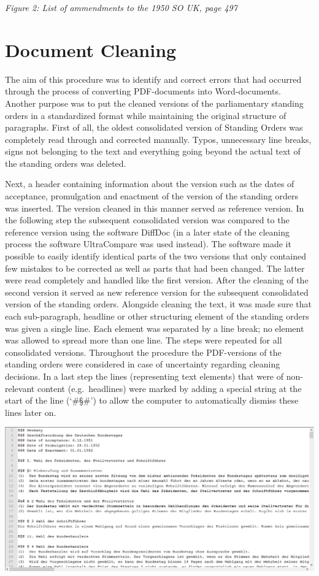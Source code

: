 \documentclass[10pt,]{article}
\begin{document}
\emph{Figure 2: List of ammendments to the 1950 SO UK, page 497}

\newpage

\section{Document Cleaning}\label{document-cleaning}

The aim of this procedure was to identify and correct errors that had
occurred through the process of converting PDF-documents into
Word-documents. Another purpose was to put the cleaned versions of the
parliamentary standing orders in a standardized format while maintaining
the original structure of paragraphs. First of all, the oldest
consolidated version of Standing Orders was completely read through and
corrected manually. Typos, unnecessary line breaks, signs not belonging
to the text and everything going beyond the actual text of the standing
orders was deleted.

Next, a header containing information about the version such as the
dates of acceptance, promulgation and enactment of the version of the
standing orders was inserted. The version cleaned in this manner served
as reference version. In the following step the subsequent consolidated
version was compared to the reference version using the software DiffDoc
(in a later state of the cleaning process the software UltraCompare was
used instead). The software made it possible to easily identify
identical parts of the two versions that only contained few mistakes to
be corrected as well as parts that had been changed. The latter were
read completely and handled like the first version. After the cleaning
of the second version it served as new reference version for the
subsequent consolidated version of the standing orders. Alongside
cleaning the text, it was made sure that each sub-paragraph, headline or
other structuring element of the standing orders was given a single
line. Each element was separated by a line break; no element was allowed
to spread more than one line. The steps were repeated for all
consolidated versions. Throughout the procedure the PDF-versions of the
standing orders were considered in case of uncertainty regarding
cleaning decisions. In a last step the lines (representing text
elements) that were of non-relevant content (e.g.~headlines) were marked
by adding a special string at the start of the line (`\#§\#') to allow
the computer to automatically dismiss these lines later on.

\begin{center}
\includegraphics[width=\textwidth]{fig/fig2.png}
\end{center}
\end{document}
